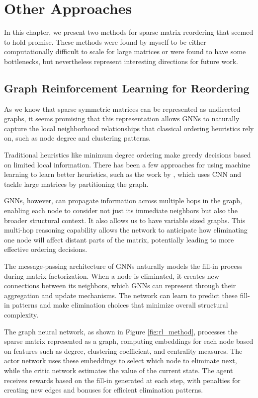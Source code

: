 \chapter{Other Approaches}
\label{ch:other_approaches}

In this chapter, we present two methods for sparse matrix reordering that seemed to hold promise. These methods were found by myself to be either computationally difficult to scale for large matrices or were found to have some bottlenecks, but nevertheless represent interesting directions for future work.

\section{Graph Reinforcement Learning for Reordering}

As we know that sparse symmetric matrices can be represented as undirected graphs, it seems promising that this representation allows GNNs to naturally capture the local neighborhood relationships that classical ordering heuristics rely on, such as node degree and clustering patterns.

Traditional heuristics like minimum degree ordering make greedy decisions based on limited local information. There has been a few approaches for using machine learning to learn better heuristics, such as the work by \cite{dasgupta_alpha_2023}, which uses CNN and tackle large matrices by partitioning the graph. 

GNNs, however, can propagate information across multiple hops in the graph, enabling each node to consider not just its immediate neighbors but also the broader structural context. It also allows us to have variable sized graphs. This multi-hop reasoning capability allows the network to anticipate how eliminating one node will affect distant parts of the matrix, potentially leading to more effective ordering decisions.

The message-passing architecture of GNNs naturally models the fill-in process during matrix factorization. When a node is eliminated, it creates new connections between its neighbors, which GNNs can represent through their aggregation and update mechanisms. The network can learn to predict these fill-in patterns and make elimination choices that minimize overall structural complexity.

The graph neural network, as shown in Figure \ref{fig:rl_method}, processes the sparse matrix represented as a graph, computing embeddings for each node based on features such as degree, clustering coefficient, and centrality measures. The actor network uses these embeddings to select which node to eliminate next, while the critic network estimates the value of the current state. The agent receives rewards based on the fill-in generated at each step, with penalties for creating new edges and bonuses for efficient elimination patterns.

